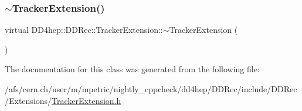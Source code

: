 \hypertarget{class_d_d4hep_1_1_d_d_rec_1_1_tracker_extension_a0220264e3c52c6b3f17b29bc817894ee}{}\label{class_d_d4hep_1_1_d_d_rec_1_1_tracker_extension_a0220264e3c52c6b3f17b29bc817894ee} 
\subsubsection{\texorpdfstring{$\sim$\+Tracker\+Extension()}{~TrackerExtension()}}
{\footnotesize\ttfamily virtual D\+D4hep\+::\+D\+D\+Rec\+::\+Tracker\+Extension\+::$\sim$\+Tracker\+Extension (\begin{DoxyParamCaption}{ }\end{DoxyParamCaption})\hspace{0.3cm}{\ttfamily [virtual]}}



The documentation for this class was generated from the following file\+:\begin{DoxyCompactItemize}
\item 
/afs/cern.\+ch/user/m/mpetric/nightly\+\_\+cppcheck/dd4hep/\+D\+D\+Rec/include/\+D\+D\+Rec/\+Extensions/\hyperlink{_tracker_extension_8h}{Tracker\+Extension.\+h}\end{DoxyCompactItemize}
